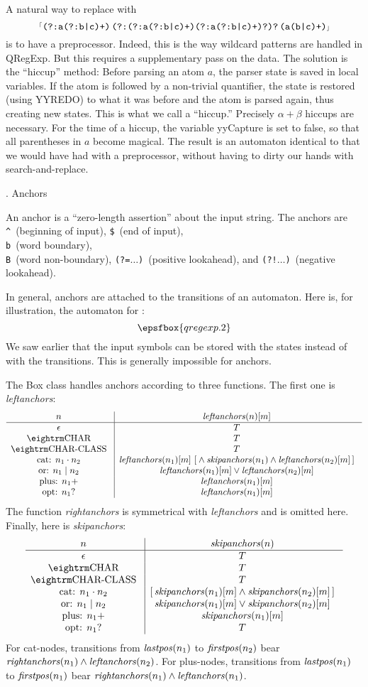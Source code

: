 A natural way to replace  with $$\hbox{{$^{\scriptscriptstyle\lceil}$\tt(?:a(?:b|c)+)$\,$(?:(?:a(?:b|c)+)(?:a(?:b|c)+)?)?$\,$(a(b|c)+)$\scriptscriptstyle\rfloor$}}$$ is to have a preprocessor.  Indeed, this is the way wildcard patterns are handled in {\sf QRegExp}.  But this requires a supplementary pass on the data.  The solution is the ``hiccup'' method:  Before parsing an atom $a$, the parser state is saved in local variables.  If the atom is followed by a non-trivial quantifier, the state is restored (using {\sf YYREDO}) to what it was before and the atom is parsed again, thus creating new states.  This is what we call a ``hiccup.''  Precisely $\alpha + \beta$ hiccups are necessary.  For the time of a hiccup, the variable {\sf yyCapture} is set to {\sf false}, so that all parentheses in $a$ become magical.  The result is an automaton identical to that we would have had with a preprocessor, without having to dirty our hands with search-and-replace.

. Anchors

An anchor is a ``zero-length assertion'' about the input string.  The anchors are {\tt\^}~(beginning of input), {\tt\$}~(end of input), {\tt\\b}~(word boundary), {\tt\\B}~(word non-boundary), {\tt(?=}$\ldots${\tt)}~(positive lookahead), and {\tt(?!}$\ldots${\tt)}~(negative lookahead).

In general, anchors are attached to the transitions of an automaton.  Here is, for illustration, the automaton for :  $$\epsfbox{qregexp.2}$$  We saw earlier that the input symbols can be stored with the states instead of with the transitions.  This is generally impossible for anchors.

The {\sf Box} class handles anchors according to three functions.  The first one is {\it leftanchors\/}:  $$\vbox{\halign{\g{#}\vrule && \g{$#$} \cr
  $n$                   & {\it leftanchors}(n)[m] \cr
\noalign{\hrule}
  $\epsilon$            & T \cr
  \tok{char}            & T \cr
  \tok{char-class}      & T \cr
  cat: $n_1 \cdot n_2$  & {\it leftanchors}(n_1)[m] \ [{} \land {\it skipanchors}(n_1) \land {\it leftanchors}(n_2)[m]\,] \cr
  or: $n_1 \mid n_2$    & {\it leftanchors}(n_1)[m] \lor {\it leftanchors}(n_2)[m] \cr
  plus: $n_1+$          & {\it leftanchors}(n_1)[m] \cr
  opt: $n_1?$           & {\it leftanchors}(n_1)[m] \cr
}}$$  The function {\it rightanchors\/} is symmetrical with {\it leftanchors} and is omitted here.  Finally, here is {\it skipanchors\/}:  $$\vbox{\halign{\g{#}\vrule && \g{$#$} \cr
  $n$                   & {\it skipanchors}(n) \cr
\noalign{\hrule}
  $\epsilon$            & T \cr
  \tok{char}            & T \cr
  \tok{char-class}      & T \cr
  cat: $n_1 \cdot n_2$  & [\,{\it skipanchors}(n_1)[m] \land {\it skipanchors}(n_2)[m]\,] \cr
  or: $n_1 \mid n_2$    & {\it skipanchors}(n_1)[m] \lor {\it skipanchors}(n_2)[m] \cr
  plus: $n_1+$          & {\it skipanchors}(n_1)[m] \cr
  opt: $n_1?$           & T \cr
}}$$  For cat-nodes, transitions from ${\it lastpos}(n_1)$ to ${\it firstpos}(n_2)$ bear ${\it rightanchors}(n_1) \land {\it leftanchors}(n_2)$.  For plus-nodes, transitions from ${\it lastpos}(n_1)$ to ${\it firstpos}(n_1)$ bear ${\it rightanchors}(n_1) \land {\it leftanchors}(n_1)$.

